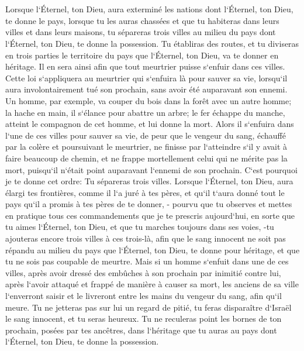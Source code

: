 \chapter{}

\verse Lorsque l`Éternel, ton Dieu, aura exterminé les nations dont l`Éternel, ton Dieu, te donne le pays, lorsque tu les auras chassées et que tu habiteras dans leurs villes et dans leurs maisons, 
\verse tu sépareras trois villes au milieu du pays dont l`Éternel, ton Dieu, te donne la possession. 
\verse Tu établiras des routes, et tu diviseras en trois parties le territoire du pays que l`Éternel, ton Dieu, va te donner en héritage. Il en sera ainsi afin que tout meurtrier puisse s`enfuir dans ces villes. 
\verse Cette loi s`appliquera au meurtrier qui s`enfuira là pour sauver sa vie, lorsqu`il aura involontairement tué son prochain, sans avoir été auparavant son ennemi. 
\verse Un homme, par exemple, va couper du bois dans la forêt avec un autre homme; la hache en main, il s`élance pour abattre un arbre; le fer échappe du manche, atteint le compagnon de cet homme, et lui donne la mort. Alors il s`enfuira dans l`une de ces villes pour sauver sa vie, 
\verse de peur que le vengeur du sang, échauffé par la colère et poursuivant le meurtrier, ne finisse par l`atteindre s`il y avait à faire beaucoup de chemin, et ne frappe mortellement celui qui ne mérite pas la mort, puisqu`il n`était point auparavant l`ennemi de son prochain. 
\verse C`est pourquoi je te donne cet ordre: Tu sépareras trois villes. 
\verse Lorsque l`Éternel, ton Dieu, aura élargi tes frontières, comme il l`a juré à tes pères, et qu`il t`aura donné tout le pays qu`il a promis à tes pères de te donner, - 
\verse pourvu que tu observes et mettes en pratique tous ces commandements que je te prescris aujourd`hui, en sorte que tu aimes l`Éternel, ton Dieu, et que tu marches toujours dans ses voies, -tu ajouteras encore trois villes à ces trois-là, 
\verse afin que le sang innocent ne soit pas répandu au milieu du pays que l`Éternel, ton Dieu, te donne pour héritage, et que tu ne sois pas coupable de meurtre. 
\verse Mais si un homme s`enfuit dans une de ces villes, après avoir dressé des embûches à son prochain par inimitié contre lui, après l`avoir attaqué et frappé de manière à causer sa mort, 
\verse les anciens de sa ville l`enverront saisir et le livreront entre les mains du vengeur du sang, afin qu`il meure. 
\verse Tu ne jetteras pas sur lui un regard de pitié, tu feras disparaître d`Israël le sang innocent, et tu seras heureux. 
\verse Tu ne reculeras point les bornes de ton prochain, posées par tes ancêtres, dans l`héritage que tu auras au pays dont l`Éternel, ton Dieu, te donne la possession. 
